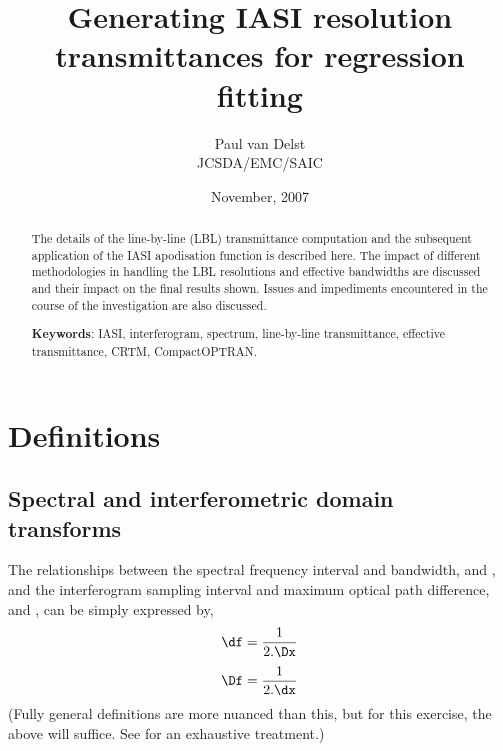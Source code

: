 



\title{Generating IASI resolution transmittances for regression fitting}
\author{Paul van Delst\\JCSDA/EMC/SAIC}
\date{November, 2007}



\maketitle

\begin{abstract}
The details of the line-by-line (LBL) transmittance computation and the subsequent application of the IASI apodisation function is described here. The impact of different methodologies in handling the LBL resolutions and effective bandwidths are discussed and their impact on the final results shown. Issues and impediments encountered in the course of the investigation are also discussed.

\textbf{Keywords}: IASI, interferogram, spectrum, line-by-line transmittance, effective transmittance, CRTM, CompactOPTRAN.
\end{abstract}


\section{Definitions}

\subsection{Spectral and interferometric domain transforms}
The relationships between the spectral frequency interval and bandwidth, {\df} and {\Df}, and the interferogram sampling interval and maximum optical path difference, {\dx} and {\Dx}, can be simply expressed by,
\begin{equation}\df = \frac{1}{2.\Dx}\label{eqn:df_deltax}\end{equation}
\begin{equation}\Df = \frac{1}{2.\dx}\label{eqn:deltaf_dx}\end{equation}
(Fully general definitions are more nuanced than this, but for this exercise, the above will suffice. See \cite{ref:bell} for an exhaustive treatment.)

